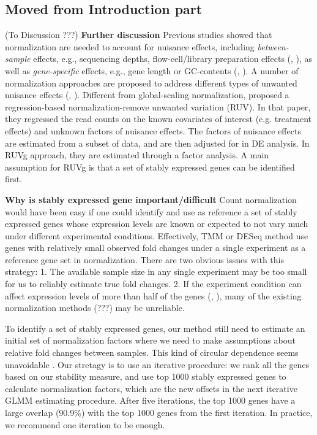 \documentclass[11pt, a4paper]{article}
\begin{document}
\subsection{Moved from Introduction part}



(To Discussion ???) {\bf Further discussion} Previous studies showed that
normalization are needed to account for nuisance effects, including
\textit{between-sample} effects, e.g., sequencing depths, flow-cell/library
preparation effects (\cite{bullard2010evaluation},
\cite{robinson2010scaling}), as well as \textit{gene-specific} effects, e.g.,
gene length or GC-contents (\cite{risso2011gc}, \cite{hansen2012removing}). A
number of normalization approaches are proposed to address different types of
unwanted nuisance effects (\cite{dillies2013comprehensive},
\cite{risso2014nat}). Different from global-scaling normalization,
\cite{risso2014nat}  proposed a regression-based normalization-remove unwanted
variation (RUV).  In that paper, they regressed the read counts on the known
covariates of interest (e.g. treatment effects) and unknown factors of
nuisance effects. The factors of nuisance effects are estimated from a subset
of data, and are then adjusted for in DE analysis. In RUVg approach, they are
estimated through a factor analysis. A main assumption for RUVg is that a set
of stably expressed genes can be identified first.


\textbf{Why is stably expressed gene important/difficult} Count normalization would have been easy if one could identify and use as reference a set of stably expressed genes whose expression levels are known or expected to not vary much under different experimental conditions.  Effectively, TMM or DESeq method use genes with relatively small observed fold changes under a single experiment as a reference gene set in normalization. There are two obvious issues with this strategy: 1. The available sample size in any single experiment may be too small for us to reliably estimate true fold changes. 2. If the experiment condition can affect expression levels of more than half of the genes (\cite{loven2012revisiting}, \cite{wu2013use}), many of the existing normalization methods (???) may be unreliable.  


To identify a set of stably expressed genes, our method still need to estimate an initial set of normalization factors where we need to make assumptions about relative fold changes between samples. This kind of circular dependence seems unavoidable \citep{vandesompele2002accurate}. Our stretagy is to use an iterative procedure: we rank all the genes based on our stability measure, and use top 1000 stably expressed genes to calculate normalization factors, which are the new offsets in the next iterative GLMM estimating procedure. After five iterations, the top 1000 genes have a large overlap (90.9\%) with the top 1000 genes from the first iteration. In practice, we recommend one iteration to be enough.  
\end{document}
